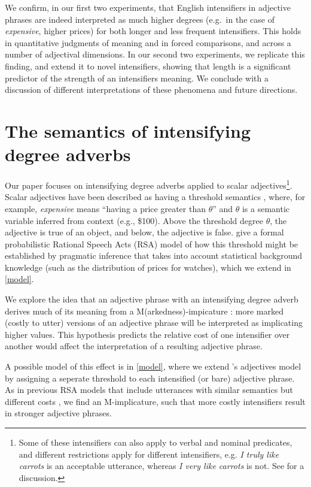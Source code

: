 \documentclass[10pt,letterpaper]{article}
\newcommand{\w}[1]{\emph{#1}}
\begin{document}
We confirm, in our first two experiments, that English intensifiers in adjective phrases are indeed interpreted as much higher degrees (e.g.~in the case of \w{expensive}, higher prices) for both longer and less frequent intensifiers. This holds in quantitative judgments of meaning and in forced comparisons, and across a number of adjectival dimensions. In our second two experiments, we replicate this finding, and extend it to novel intensifiers, showing that length is a significant predictor of the strength of an intensifiers meaning. We conclude with a discussion of different interpretations of these phenomena and future directions.

\section{The semantics of intensifying degree adverbs}

Our paper focuses on intensifying degree adverbs applied to scalar adjectives\footnote{Some of these intensifiers can also apply to verbal and nominal predicates, and different restrictions apply for different intensifiers, e.g. \w{I truly like carrots} is an acceptable utterance, whereas \w{I very like carrots} is not. See  for a discussion.}. Scalar adjectives have been described as having a threshold semantics \cite{kennedy}, where, for example, \w{expensive} means ``having a price greater than $\theta$'' and $\theta$ is a semantic variable inferred from context (e.g., \$100). Above the threshold degree $\theta$, the adjective is true of an object, and below, the adjective is false.  give a formal probabilistic Rational Speech Acts (RSA) \cite{frank,goodman} model of how this threshold might be established by pragmatic inference that takes into account statistical background knowledge (such as the distribution of prices for watches), which we extend in \ref{model}.

We explore the idea that an adjective phrase with an intensifying degree adverb derives much of its meaning from a M(arkedness)-impicature \cite{levinson}: more marked (costly to utter) versions of an adjective phrase will be interpreted as implicating higher values. This hypothesis predicts the relative cost of one intensifier over another would affect the interpretation of a resulting adjective phrase.

A possible model of this effect is in \ref{model}, where we extend 's adjectives model by assigning a seperate threshold to each intensified (or bare) adjective phrase. As in previous RSA models that include utterances with similar semantics but different costs \cite{bergen}, we find an M-implicature, such that more costly intensifiers result in stronger adjective phrases.
\end{document}

